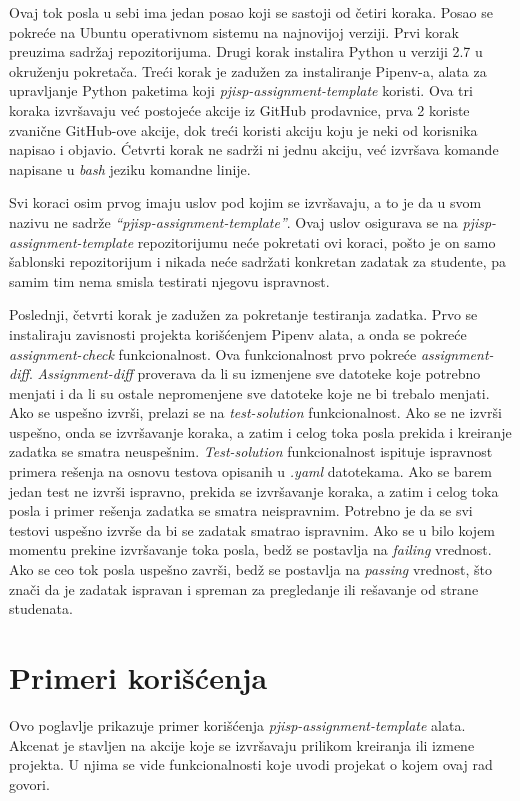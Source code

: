 \documentclass[12pt]{report}
\begin{document}
Ovaj tok posla u sebi ima jedan posao koji se sastoji od četiri koraka. Posao se pokreće na Ubuntu operativnom sistemu na najnovijoj verziji. Prvi korak preuzima sadržaj repozitorijuma. Drugi korak instalira Python u verziji 2.7 u okruženju pokretača. Treći korak je zadužen za instaliranje Pipenv-a, alata za upravljanje Python paketima koji \textit{pjisp-assignment-template} koristi. Ova tri koraka izvršavaju već postojeće akcije iz GitHub prodavnice, prva 2 koriste zvanične GitHub-ove akcije, dok treći koristi akciju koju je neki od korisnika napisao i objavio. Ćetvrti korak ne sadrži ni jednu akciju, već izvršava komande napisane u \textit{bash} jeziku komandne linije.

Svi koraci osim prvog imaju uslov pod kojim se izvršavaju, a to je da u svom nazivu ne sadrže \textit{``pjisp-assignment-template''}. Ovaj uslov osigurava se na \textit{pjisp-assignment-template} repozitorijumu neće pokretati ovi koraci, pošto je on samo šablonski repozitorijum i nikada neće sadržati konkretan zadatak za studente, pa samim tim nema smisla testirati njegovu ispravnost.

Poslednji, četvrti korak je zadužen za pokretanje testiranja zadatka. Prvo se instaliraju zavisnosti projekta korišćenjem Pipenv alata, a onda se pokreće \textit{assignment-check} funkcionalnost. Ova funkcionalnost prvo pokreće \textit{assignment-diff}. \textit{Assignment-diff} proverava da li su izmenjene sve datoteke koje potrebno menjati i da li su ostale nepromenjene sve datoteke koje ne bi trebalo menjati. Ako se uspešno izvrši, prelazi se na \textit{test-solution} funkcionalnost. Ako se ne izvrši uspešno, onda se izvršavanje koraka, a zatim i celog toka posla prekida i kreiranje zadatka se smatra neuspešnim. \textit{Test-solution} funkcionalnost ispituje ispravnost primera rešenja na osnovu testova opisanih u \textit{.yaml} datotekama. Ako se barem jedan test ne izvrši ispravno, prekida se izvršavanje koraka, a zatim i celog toka posla i primer rešenja zadatka se smatra neispravnim. Potrebno je da se svi testovi uspešno izvrše da bi se zadatak smatrao ispravnim. Ako se u bilo kojem momentu prekine izvršavanje toka posla, bedž se postavlja na \textit{failing} vrednost. Ako se ceo tok posla uspešno završi, bedž se postavlja na \textit{passing} vrednost, što znači da je zadatak ispravan i spreman za pregledanje ili rešavanje od strane studenata.

\chapter{Primeri korišćenja}
Ovo poglavlje prikazuje primer korišćenja \textit{pjisp-assignment-template} alata. Akcenat je stavljen na akcije koje se izvršavaju prilikom kreiranja ili izmene projekta. U njima se vide funkcionalnosti koje uvodi projekat o kojem ovaj rad govori.
\end{document}
